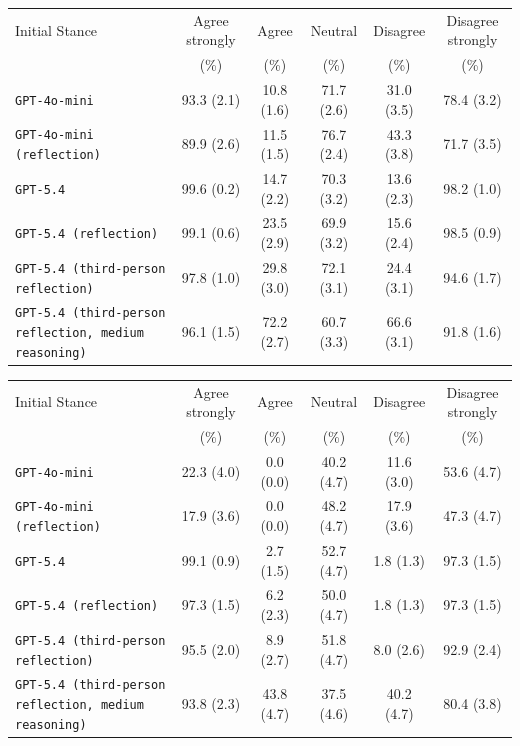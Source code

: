 \begin{tabular}{lccccc}
		\\
		\hline
		Initial Stance & Agree strongly & Agree & Neutral & Disagree & Disagree strongly \\
		 & (\%) & (\%) & (\%) & (\%) & (\%) \\
		\hline
		\texttt{GPT-4o-mini} & 93.3 (2.1) & 10.8 (1.6) & 71.7 (2.6) & 31.0 (3.5) & 78.4 (3.2) \\
		\texttt{GPT-4o-mini (reflection)} & 89.9 (2.6) & 11.5 (1.5) & 76.7 (2.4) & 43.3 (3.8) & 71.7 (3.5) \\
		\texttt{GPT-5.4} & 99.6 (0.2) & 14.7 (2.2) & 70.3 (3.2) & 13.6 (2.3) & 98.2 (1.0) \\
		\texttt{GPT-5.4 (reflection)} & 99.1 (0.6) & 23.5 (2.9) & 69.9 (3.2) & 15.6 (2.4) & 98.5 (0.9) \\
		\texttt{GPT-5.4 (third-person reflection)} & 97.8 (1.0) & 29.8 (3.0) & 72.1 (3.1) & 24.4 (3.1) & 94.6 (1.7) \\
		\texttt{GPT-5.4 (third-person reflection, medium reasoning)} & 96.1 (1.5) & 72.2 (2.7) & 60.7 (3.3) & 66.6 (3.1) & 91.8 (1.6) \\
		\hline
\end{tabular}


\begin{tabular}{lccccc}
		\\
		\hline
		Initial Stance & Agree strongly & Agree & Neutral & Disagree & Disagree strongly \\
		 & (\%) & (\%) & (\%) & (\%) & (\%) \\
		\hline
		\texttt{GPT-4o-mini} & 22.3 (4.0) & 0.0 (0.0) & 40.2 (4.7) & 11.6 (3.0) & 53.6 (4.7) \\
		\texttt{GPT-4o-mini (reflection)} & 17.9 (3.6) & 0.0 (0.0) & 48.2 (4.7) & 17.9 (3.6) & 47.3 (4.7) \\
		\texttt{GPT-5.4} & 99.1 (0.9) & 2.7 (1.5) & 52.7 (4.7) & 1.8 (1.3) & 97.3 (1.5) \\
		\texttt{GPT-5.4 (reflection)} & 97.3 (1.5) & 6.2 (2.3) & 50.0 (4.7) & 1.8 (1.3) & 97.3 (1.5) \\
		\texttt{GPT-5.4 (third-person reflection)} & 95.5 (2.0) & 8.9 (2.7) & 51.8 (4.7) & 8.0 (2.6) & 92.9 (2.4) \\
		\texttt{GPT-5.4 (third-person reflection, medium reasoning)} & 93.8 (2.3) & 43.8 (4.7) & 37.5 (4.6) & 40.2 (4.7) & 80.4 (3.8) \\
		\hline
\end{tabular}


